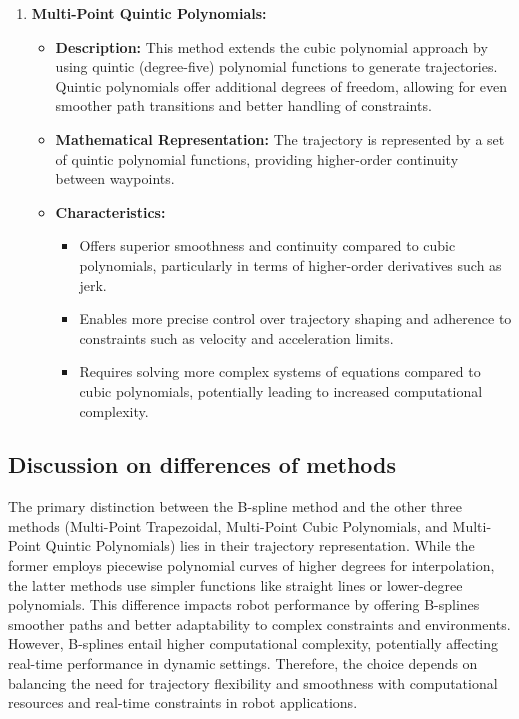 \documentclass[conference]{IEEEtran}
\begin{document}
\begin{enumerate}
    \item \textbf{Multi-Point Quintic Polynomials:}
          \begin{itemize}
              \item \textbf{Description:} This method extends the cubic polynomial approach by using quintic (degree-five) polynomial functions to generate trajectories. Quintic polynomials offer additional degrees of freedom, allowing for even smoother path transitions and better handling of constraints.
              \item \textbf{Mathematical Representation:} The trajectory is represented by a set of quintic polynomial functions, providing higher-order continuity between waypoints.
              \item \textbf{Characteristics:}
                    \begin{itemize}
                        \item Offers superior smoothness and continuity compared to cubic polynomials, particularly in terms of higher-order derivatives such as jerk.
                        \item Enables more precise control over trajectory shaping and adherence to constraints such as velocity and acceleration limits.
                        \item Requires solving more complex systems of equations compared to cubic polynomials, potentially leading to increased computational complexity.
                    \end{itemize}
          \end{itemize}
\end{enumerate}

\subsection{Discussion on differences of methods}
The primary distinction between the B-spline method and the other three methods (Multi-Point Trapezoidal, Multi-Point Cubic Polynomials, and Multi-Point Quintic Polynomials) lies in their trajectory representation. While the former employs piecewise polynomial curves of higher degrees for interpolation, the latter methods use simpler functions like straight lines or lower-degree polynomials. This difference impacts robot performance by offering B-splines smoother paths and better adaptability to complex constraints and environments. However, B-splines entail higher computational complexity, potentially affecting real-time performance in dynamic settings. Therefore, the choice depends on balancing the need for trajectory flexibility and smoothness with computational resources and real-time constraints in robot applications.
\end{document}
